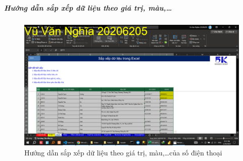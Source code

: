 \documentclass{article}
\begin{document}
\subparagraph{Hướng dẫn sắp xếp dữ liệu theo giá trị, màu,\dots}

\begin{figure}[h]
    \centering
    \includegraphics[scale = 0.15]{Video1/HuongDan/3.png}
    \caption{Hướng dẫn sắp xếp dữ liệu theo giá trị, màu,\dots của số điện thoại}
\end{figure}


\end{document}
